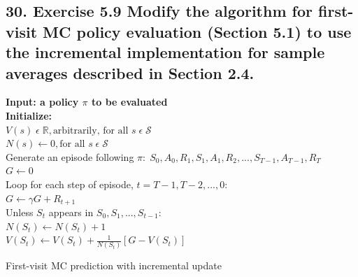 \subsection*{30. Exercise 5.9 Modify the algorithm for first-visit MC policy evaluation (Section 5.1) to use the incremental implementation for sample averages described in Section 2.4.}
\begin{algorithm}[ht]
\textbf{Input: a policy $\pi$ to be evaluated}\\
\textbf{Initialize:}\\
$V(s) \; \epsilon \; \mathbb{R}, \text{arbitrarily, for all } s\; \epsilon\; \mathcal{S}$\\
$N(s) \leftarrow 0, \text{for all } s\; \epsilon \; \mathcal{S}$\\
	{
		Generate an episode following $\pi:\; S_0, A_0,R_1, S_1, A_1,R_2,...,S_{T-1}, A_{T-1}, R_T $\\
		$G \leftarrow 0$ \\
		Loop for each step of episode, $t=T-1, T-2,...,0:$\\
		\quad $G\leftarrow \gamma G + R_{t+1}$\\
		\quad Unless $S_t$ appears in $S_0, S_1,...,S_{t-1}$:\\
		\quad \quad $N(S_t) \leftarrow N(S_t) + 1$ \\
		\quad \quad $V(S_t) \leftarrow V(S_t) + \frac{1}{N(S_t)}[G - V(S_t)]$
	}

 \caption{First-visit MC prediction with incremental update}
\end{algorithm}
